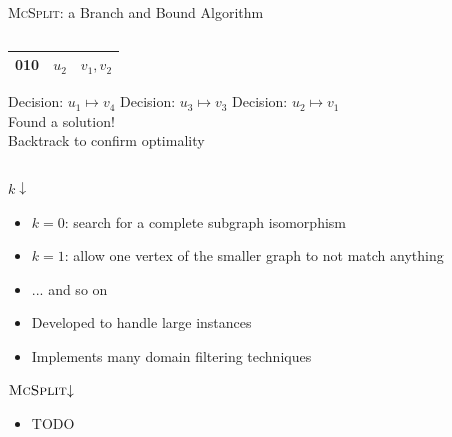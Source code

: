 \documentclass{beamer}
\begin{document}
\begin{frame}{\textsc{McSplit}: a Branch and Bound Algorithm}
\begin{columns}
\begin{column}{0.5\textwidth}
\begin{table}
\begin{overlayarea}{\textwidth}{2cm}
{\begin{tabular}{c c c}
              \midrule
              010 & $u_2$ & $v_1, v_2$ \\
              \bottomrule
            \end{tabular}
          }
        \end{overlayarea}
      \end{table}
      \begin{overprint}
        Decision: $u_1 \mapsto v_4$
        Decision: $u_3 \mapsto v_3$
        Decision: $u_2 \mapsto v_1$\\ Found a solution! \\ Backtrack to confirm optimality
      \end{overprint}
    \end{column}
  \end{columns}
\end{frame}

\begin{frame}{$k{\downarrow}$}
  \begin{itemize}
  \item $k = 0$: search for a complete subgraph isomorphism
  \item $k = 1$: allow one vertex of the smaller graph to not match anything
  \item ... and so on
  \item Developed to handle large instances
  \item Implements many domain filtering techniques
  \end{itemize}
\end{frame}

\begin{frame}{$\textsc{McSplit}{\downarrow}$}
  \begin{itemize}
  \item TODO
  \end{itemize}
\end{frame}
\end{document}
